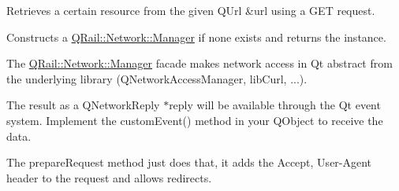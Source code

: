 Retrieves a certain resource from the given Q\+Url \&url using a G\+ET request.

Constructs a \mbox{\hyperlink{classQRail_1_1Network_1_1Manager}{Q\+Rail\+::\+Network\+::\+Manager}} if none exists and returns the instance.

The \mbox{\hyperlink{classQRail_1_1Network_1_1Manager}{Q\+Rail\+::\+Network\+::\+Manager}} facade makes network access in Qt abstract from the underlying library (Q\+Network\+Access\+Manager, lib\+Curl, ...).

The result as a Q\+Network\+Reply $\ast$reply will be available through the Qt event system. Implement the custom\+Event() method in your Q\+Object to receive the data.

The prepare\+Request method just does that, it adds the Accept, User-\/\+Agent header to the request and allows redirects. 